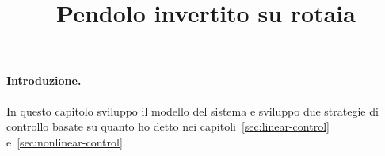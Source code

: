\title{Pendolo invertito su rotaia}
\maketitle
\label{sec:pic}


\paragraph{Introduzione.}
In questo capitolo sviluppo il modello del sistema e sviluppo due strategie di controllo
basate su quanto ho detto nei capitoli~\ref{sec:linear-control} e~\ref{sec:nonlinear-control}.
 




